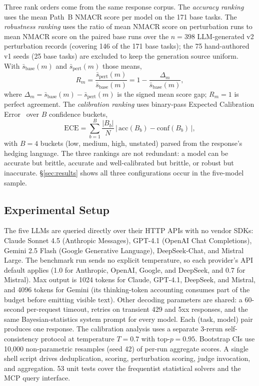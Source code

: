 Three rank orders come from the same response corpus. The
\emph{accuracy ranking} uses the mean Path~B NMACR score per model
on the 171 base tasks. The \emph{robustness ranking} uses the ratio
of mean NMACR score on perturbation runs to mean NMACR score on the
paired base runs over the $n=398$ LLM-generated v2 perturbation
records (covering 146 of the 171 base tasks); the 75 hand-authored
v1 seeds (25 base tasks) are excluded to keep the generation source
uniform. With $\bar{s}_{\text{base}}(m)$ and
$\bar{s}_{\text{pert}}(m)$ those means,
\begin{equation}
  R_m = \frac{\bar{s}_{\text{pert}}(m)}{\bar{s}_{\text{base}}(m)}
      = 1 - \frac{\Delta_m}{\bar{s}_{\text{base}}(m)},
  \label{eq:robustness}
\end{equation}
where $\Delta_m = \bar{s}_{\text{base}}(m) - \bar{s}_{\text{pert}}(m)$
is the signed mean score gap; $R_m = 1$ is perfect agreement. The
\emph{calibration ranking} uses binary-pass Expected Calibration
Error~\cite{guo2017calibration} over $B$ confidence buckets,
\begin{equation}
  \mathrm{ECE} = \sum_{b=1}^{B} \frac{|B_b|}{N}
                 \,\bigl|\,\mathrm{acc}(B_b) - \mathrm{conf}(B_b)\,\bigr|,
  \label{eq:ece}
\end{equation}
with $B = 4$ buckets (low, medium, high, unstated) parsed from the
response's hedging language. The three rankings are not redundant:
a model can be accurate but brittle, accurate and well-calibrated
but brittle, or robust but inaccurate. \S\ref{sec:results} shows
all three configurations occur in the five-model sample.

\subsection{Experimental Setup}

The five LLMs are queried directly over their HTTP APIs with no
vendor SDKs: Claude Sonnet 4.5 (Anthropic Messages), GPT-4.1 (OpenAI
Chat Completions), Gemini 2.5 Flash (Google Generative Language),
DeepSeek-Chat, and Mistral Large. The benchmark run sends no
explicit temperature, so each provider's API default applies (1.0
for Anthropic, OpenAI, Google, and DeepSeek, and 0.7 for Mistral). Max
output is 1024 tokens for Claude, GPT-4.1, DeepSeek, and Mistral,
and 4096 tokens for Gemini (its thinking-token accounting consumes
part of the budget before emitting visible text). Other decoding
parameters are shared: a 60-second per-request timeout, retries on
transient 429 and 5xx responses, and the same Bayesian-statistics
system prompt for every model. Each (task, model) pair produces one
response. The calibration analysis uses a separate 3-rerun
self-consistency protocol at temperature $T = 0.7$ with
top-$p = 0.95$.
Bootstrap CIs use 10{,}000 non-parametric resamples (seed 42) of
per-run aggregate scores. A single shell script drives deduplication,
scoring, perturbation scoring, judge invocation, and aggregation.
53 unit tests cover the frequentist statistical solvers and the MCP
query interface.

